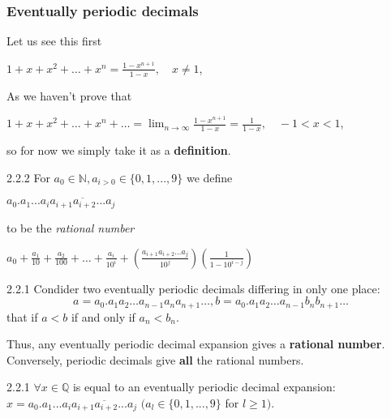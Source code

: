 \documentclass[a4paper]{article}
\begin{document}
\subsubsection{Eventually periodic decimals}
Let us see this first
\begin{center}
    $1+x+x^2+\ldots +x^n=\frac{1-x^{n+1}}{1-x}, \quad x\neq 1$,
\end{center}
As we haven't prove that 
\begin{center}
    $1+x+x^2+\ldots+x^n+\ldots = \lim_{n \to \infty}\frac{1-x^{n+1}}{1-x}=\frac{1}{1-x},\quad -1<x<1$,
\end{center}
so for now we simply take it as a \textbf{definition}.
\begin{definition}{2.2.2}{}
    For $a_0 \in \mathbb{N},a_{i>0}\in \{0,1,...,9\}$ we define
    \begin{center}
        $a_0.a_1...a_i \overline{a_{i+1}a_{i+2}...a_j}$
    \end{center}
    to be the \emph{rational number}
    \begin{center}
        $a_0+\frac{a_1}{10}+\frac{a_2}{100}+ \ldots +\frac{a_i}{10^i}+(\frac{a_{i+1}a_{i+2}\ldots a_j}{10^j})(\frac{1}{1-10^{i-j}})$
    \end{center}
\end{definition}
\begin{proposition}{2.2.1}{}
Condider two eventually periodic decimals differing in only one place:
    \begin{equation}
        a=a_0.a_1a_2 \ldots a_{n-1}a_na_{n+1}\ldots,b=a_0.a_1a_2\ldots a_{n-1}b_nb_{n+1}\ldots \tag{2.6}
    \end{equation}
    that if $a<b$ if and only if $a_n<b_n$.
\end{proposition}
Thus, any eventually periodic decimal expansion gives a \textbf{rational number}. Conversely, periodic decimals give \textbf{all} the rational numbers.
\begin{theorem}{2.2.1}{}
         $\forall x\in \mathbb{Q}$ is equal to an eventually periodic decimal expansion: $x=a_0.a_1...a_i\overline{a_{i+1}a_{i+2}...a_j}$ $(a_l \in \{0,1,...,9\} $ for $l \geq 1).$
\end{theorem}
\end{document}
